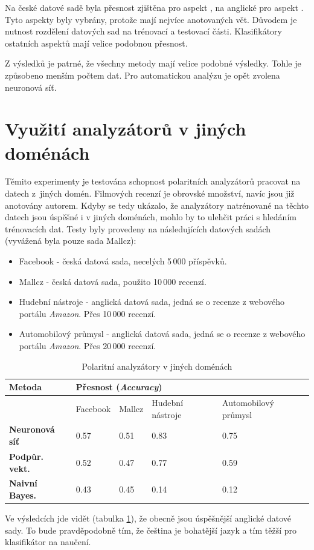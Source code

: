 Na české datové sadě byla přesnost zjištěna pro aspekt , na anglické pro aspekt . Tyto aspekty byly vybrány, protože mají nejvíce anotovaných vět. Důvodem je nutnost rozdělení datových sad na trénovací a testovací části. Klasifikátory ostatních aspektů mají velice podobnou přesnost.

Z výsledků je patrné, že všechny metody mají velice podobné výsledky. Tohle je způsobeno menším počtem dat. Pro automatickou analýzu je opět zvolena neuronová síť. 

\section{Využití analyzátorů v jiných doménách}
Těmito experimenty je testována schopnost polaritních analyzátorů pracovat na datech z~jiných domén. Filmových recenzí je obrovské množství, navíc jsou již anotovány autorem. Kdyby se tedy ukázalo, že analyzátory natrénované na těchto datech jsou úspěšné i v jiných doménách, mohlo by  to ulehčit práci s hledáním trénovacích dat.  Testy byly provedeny na následujících datových sadách (vyvážená byla pouze sada Mallcz):
\begin{itemize}
    \item Facebook - česká datová sada, necelých 5\,000 příspěvků.
    \item Mallcz - česká datová sada, použito 10\,000 recenzí.
    \item Hudební nástroje - anglická datová sada, jedná se o recenze z webového portálu \emph{Amazon}. Přes 10\,000 recenzí.
    \item Automobilový průmysl - anglická datová sada, jedná se o recenze z webového portálu \emph{Amazon}. Přes 20\,000 recenzí.
    \end{itemize}

\FloatBarrier
\begin{table}[h!]
  \begin{center}
    \caption{Polaritní analyzátory v jiných doménách}
    \label{tab:table1.8}
    \begin{tabular}{l|l|l|l|l}
      \textbf{Metoda} &  \multicolumn{4}{l}{\textbf{Přesnost (\emph{Accuracy})}}\\ %
      \hline
      \textbf & Facebook & Mallcz & Hudební nástroje & Automobilový průmysl \\ 
      \textbf{Neuronová síť} & 0.57 & 0.51 & 0.83 & 0.75  \\ 
      \textbf{Podpůr. vekt.} & 0.52 & 0.47 & 0.77 & 0.59 \\  \textbf{Naivní Bayes.} & 0.43 & 0.45 & 0.14 & 0.12 \\ 
     \end{tabular}
  \end{center}
\end{table}
\FloatBarrier
Ve výsledcích jde vidět (tabulka \ref{tab:table1.8}), že obecně jsou úspěšnější anglické datové sady. To bude pravděpodobně tím, že čeština je bohatější jazyk a tím těžší pro klasifikátor na naučení. 

